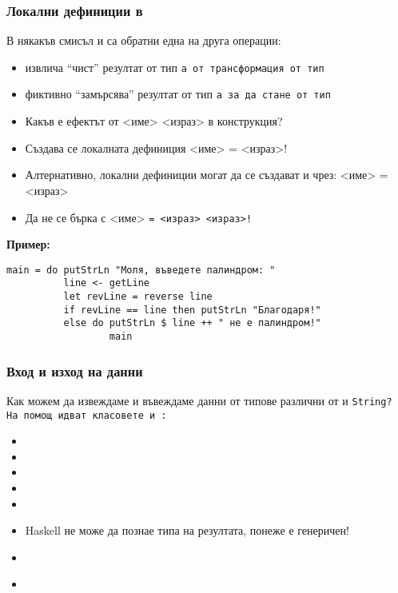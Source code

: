 \documentclass[alsotrans]{beamerswitch}
\begin{document}
\begin{frame}
  \frametitle{Локални дефиниции в }
  \small
  В някакъв смисъл \lst{<-} и  са обратни една на друга операции:
  \begin{itemize}[<+->]
  \item \lst{<-} извлича ``чист'' резултат от тип \tt{a} от трансформация от тип 
  \item {} фиктивно ``замърсява'' резултат от тип \tt{a} за да стане от тип 
  \item Какъв е ефектът от <име>  <израз> в  конструкция?
  \item Създава се локалната дефиниция <име> = <израз>!
  \item Алтернативно, локални дефиниции могат да се създават и чрез:  <име> \tta= <израз>
  \item Да не се бърка с  <име> \tt= <израз>  <израз>!
  \end{itemize}
  \onslide<+->
  \textbf{Пример:}
  \vspace{-.5ex}
  \lstfootnotesize
\begin{lstlisting}
main = do putStrLn "Моля, въведете палиндром: "
          line <- getLine
          let revLine = reverse line
          if revLine == line then putStrLn "Благодаря!"
          else do putStrLn $ line ++ " не е палиндром!"
                  main
\end{lstlisting}
\end{frame}

\begin{frame}
  \frametitle{Вход и изход на данни}

  Как можем да извеждаме и въвеждаме данни от типове различни от  и \tt{String}?\\[2ex]
  \pause
  На помощ идват класовете  и :
  \begin{itemize}[<+->]
  \item {}
  \item {}
  \item {}
  \item {}
  \item {}
  \item Haskell не може да познае типа на резултата, понеже е генеричен!
  \item {}
  \item {}\\
    \hspace{7em}
  \end{itemize}
\end{frame}
\end{document}
